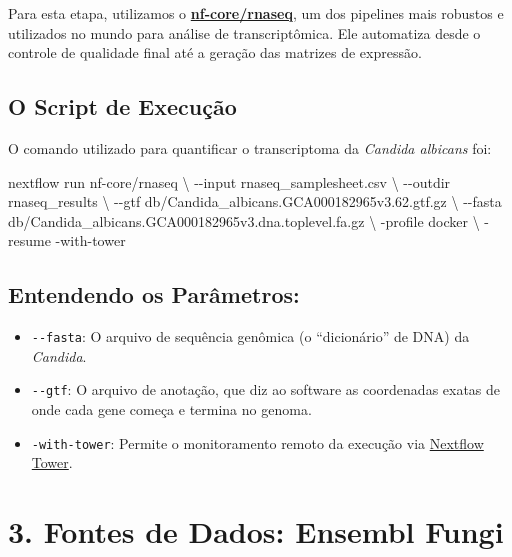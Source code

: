 \documentclass[
  letterpaper,
  DIV=11,
  numbers=noendperiod]{scrreprt}
\newenvironment{Shaded}{\begin{snugshade}}{\end{snugshade}}
\newcommand{\AttributeTok}[1]{\textcolor[rgb]{0.40,0.45,0.13}{#1}}
\newcommand{\DataTypeTok}[1]{\textcolor[rgb]{0.68,0.00,0.00}{#1}}
\newcommand{\ExtensionTok}[1]{\textcolor[rgb]{0.00,0.23,0.31}{#1}}
\newcommand{\NormalTok}[1]{\textcolor[rgb]{0.00,0.23,0.31}{#1}}
\providecommand{\tightlist}{%
  \setlength{\itemsep}{0pt}\setlength{\parskip}{0pt}}
\begin{document}
Para esta etapa, utilizamos o
\href{https://nf-co.re/rnaseq}{\textbf{nf-core/rnaseq}}, um dos
pipelines mais robustos e utilizados no mundo para análise de
transcriptômica. Ele automatiza desde o controle de qualidade final até
a geração das matrizes de expressão.

\subsection{O Script de Execução}\label{o-script-de-execuuxe7uxe3o-1}

O comando utilizado para quantificar o transcriptoma da \emph{Candida
albicans} foi:

\begin{Shaded}
\begin{Highlighting}[]
\ExtensionTok{nextflow}\NormalTok{ run nf{-}core/rnaseq }\DataTypeTok{\textbackslash{}}
    \AttributeTok{{-}{-}input}\NormalTok{ rnaseq\_samplesheet.csv }\DataTypeTok{\textbackslash{}}
    \AttributeTok{{-}{-}outdir}\NormalTok{ rnaseq\_results }\DataTypeTok{\textbackslash{}}
    \AttributeTok{{-}{-}gtf}\NormalTok{ db/Candida\_albicans.GCA000182965v3.62.gtf.gz }\DataTypeTok{\textbackslash{}}
    \AttributeTok{{-}{-}fasta}\NormalTok{ db/Candida\_albicans.GCA000182965v3.dna.toplevel.fa.gz }\DataTypeTok{\textbackslash{}}
    \AttributeTok{{-}profile}\NormalTok{ docker }\DataTypeTok{\textbackslash{}}
    \AttributeTok{{-}resume} \AttributeTok{{-}with{-}tower}
\end{Highlighting}
\end{Shaded}

\subsection{Entendendo os
Parâmetros:}\label{entendendo-os-paruxe2metros-1}

\begin{itemize}
\tightlist
\item
  \texttt{-\/-fasta}: O arquivo de sequência genômica (o ``dicionário''
  de DNA) da \emph{Candida}.
\item
  \texttt{-\/-gtf}: O arquivo de anotação, que diz ao software as
  coordenadas exatas de onde cada gene começa e termina no genoma.
\item
  \texttt{-with-tower}: Permite o monitoramento remoto da execução via
  \href{https://tower.nf/}{Nextflow Tower}.
\end{itemize}

\section{3. Fontes de Dados: Ensembl
Fungi}\label{fontes-de-dados-ensembl-fungi}
\end{document}
